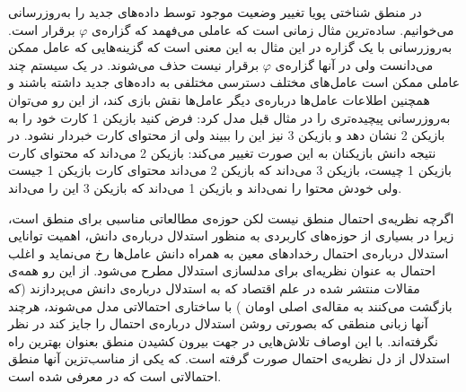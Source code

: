 در منطق شناختی پویا تغییر وضعیت موجود توسط داده‌های جدید را به‌روزرسانی می‌خوانیم. ساده‌ترین مثال زمانی است که عاملی می‌فهمد که گزاره‌ی $ \varphi $ برقرار است. به‌روزرسانی با یک گزاره در این مثال به این معنی است که گزینه‌هایی که عامل ممکن می‌دانست ولی در آنها گزاره‌ی $ \varphi $ برقرار نیست حذف می‌شوند. در یک سیستم چند عاملی ممکن است عامل‌های مختلف دسترسی مختلفی به داده‌های جدید داشته باشند و همچنین اطلاعات عامل‌ها درباره‌ی دیگر عامل‌ها نقش بازی کند، از این رو می‌توان به‌روزرسانی پیچیده‌تری را در مثال قبل مدل کرد: فرض کنید بازیکن 1 کارت خود را به بازیکن 2 نشان دهد و بازیکن 3 نیز این را ببیند ولی از محتوای کارت خبردار نشود. در نتیجه دانش بازیکنان به این صورت تغییر می‌کند: بازیکن 2 می‌داند که محتوای کارت بازیکن 1 چیست، بازیکن 3 می‌داند که بازیکن 2 می‌داند محتوای کارت بازیکن 1 جیست ولی خودش محتوا را نمی‌داند و بازیکن 1 می‌داند که بازیکن 3 این را می‌داند.

اگرچه نظریه‌ی احتمال منطق نیست لکن حوزه‌ی مطالعاتی مناسبی برای منطق است، زیرا در بسیاری از حوزه‌های کاربردی به منظور استدلال درباره‌ی دانش، اهمیت توانایی استدلال درباره‌ی احتمال رخدادهای معین به همراه دانش عامل‌ها رخ می‌نماید و اغلب احتمال به عنوان نظریه‌ای برای مدلسازی استدلال مطرح می‌شود.
از این رو همه‌ی مقالات منتشر شده در علم اقتصاد که به استدلال درباره‌ی دانش می‌پردازند (که بازگشت می‌کنند به مقاله‌ی اصلی اومان \citep{Aumann1976}) با ساختاری احتمالاتی مدل می‌شوند، هرچند آنها زبانی منطقی که بصورتی روشن استدلال درباره‌ی احتمال را جایز کند در نظر نگرفته‌اند. با این اوصاف تلاش‌هایی در جهت بیرون کشیدن منطق بعنوان بهترین راه استدلال از دل نظریه‌ی احتمال صورت گرفته است. که یکی از مناسب‌تزین آنها منطق احتمالاتی است که در \citep{Fagin1990} معرفی شده است.